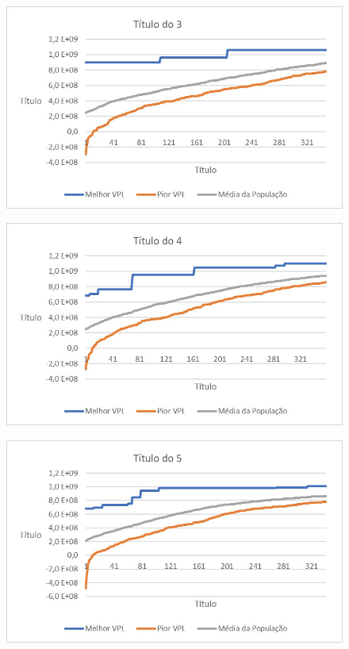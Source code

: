 \documentclass[12pt,a4paper]{report}
\begin{document}
\begin{figure}[H]
\centering

\includegraphics[scale=1]{ApE/AGRPCO1/3}

\end{figure}
\begin{figure}[H]
\centering

\includegraphics[scale=1]{ApE/AGRPCO1/4}

\end{figure}
\begin{figure}[H]
\centering

\includegraphics[scale=1]{ApE/AGRPCO1/5}

\end{figure}
\end{document}
